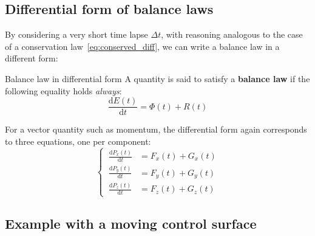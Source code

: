 \documentclass[a4paper,12pt,%
onecolumn,oneside,%
british%
]{memoir}
\newcommand*{\di}{\mathrm{d}}%
\newcommand*{\incr}{\Delta}%
\renewcommand*{\|}[1][]{\nonscript\:#1\vert\nonscript\:\mathopen{}}
\newcommand*{\Dt}{\incr t}
\newcommand*{\yE}{E}
\newcommand*{\yH}{\varPhi}%
\newcommand*{\yR}{R}%
\begin{document}
\subsection{Differential form of balance laws}
\label{sec:balance_laws_diff}

By considering a very short time lapse $\Dt$, with reasoning analogous to the case of a conservation law~\eqref{eq:conserved_diff}, we can write a balance law in a different form:
\begin{definition}{Balance law in differential form}
  A quantity is said to satisfy a \textbf{balance law} if the following equality holds \emph{always}:
  \begin{equation}
    \label{eq:balance_diff}
    \frac{\di\yE(t)}{\di t} = \yH(t) + \yR(t)
  \end{equation}

  For a vector quantity such as momentum, the differential form again corresponds to three equations, one per component:
\begin{equation}
      \label{eq:balance_diff_components}
\left\{\   \begin{aligned}
    \frac{\di P_{x}(t)}{\di t} &= F_{x}(t) + G_{x}(t)
\\
    \frac{\di P_{y}(t)}{\di t} &= F_{y}(t) + G_{y}(t)
\\
    \frac{\di P_{z}(t)}{\di t} &= F_{z}(t) + G_{z}(t)
  \end{aligned}\right.
\end{equation}
\end{definition}


\subsection{Example with a moving control surface}
\label{sec:example_balance_vect}
\end{document}
